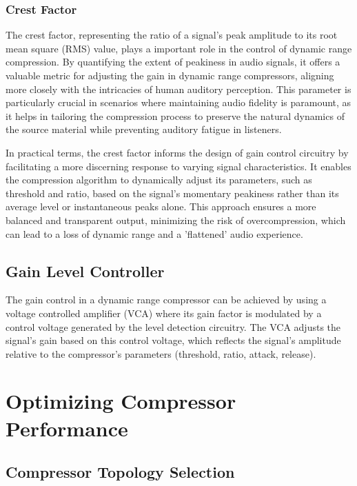 \documentclass[10pt]{article}
\begin{document}
\begin{multicols*}{2}
                \subsubsection{Crest Factor}
                    The crest factor, representing the ratio of a signal's peak amplitude to its root mean square (RMS) value, plays a important role in the control of dynamic range compression. By quantifying the extent of peakiness in audio signals, it offers a valuable metric for adjusting the gain in dynamic range compressors, aligning more closely with the intricacies of human auditory perception. This parameter is particularly crucial in scenarios where maintaining audio fidelity is paramount, as it helps in tailoring the compression process to preserve the natural dynamics of the source material while preventing auditory fatigue in listeners.\par
                    In practical terms, the crest factor informs the design of gain control circuitry by facilitating a more discerning response to varying signal characteristics. It enables the compression algorithm to dynamically adjust its parameters, such as threshold and ratio, based on the signal's momentary peakiness rather than its average level or instantaneous peaks alone. This approach ensures a more balanced and transparent output, minimizing the risk of overcompression, which can lead to a loss of dynamic range and a 'flattened' audio experience.

            \subsection{Gain Level Controller}
                The gain control in a dynamic range compressor can be achieved by using a voltage controlled amplifier (VCA) where its gain factor is modulated by a control voltage generated by the level detection circuitry. The VCA adjusts the signal's gain based on this control voltage, which reflects the signal's amplitude relative to the compressor's parameters (threshold, ratio, attack, release).
        
        \section[Optimizing Compressor Performance]{Optimizing Compressor\\Performance}
            
            \subsection{Compressor Topology Selection}


\end{multicols*}
\end{document}
